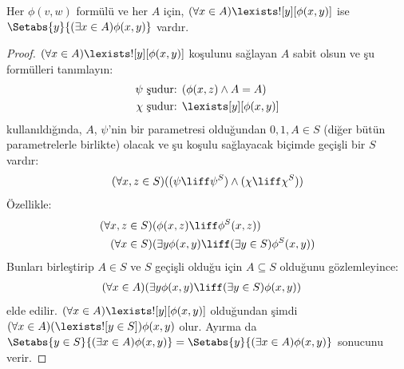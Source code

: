 \begin{thm}\label{thm:replacement} 
Her $\phi(v,w)$ formülü ve her $A$ için, $(\forall x \in
A)\lexists![y][\phi(x,y)]$ ise $\Setabs{y}{(\exists x \in A)\phi(x,y)}$
vardır.
\end{thm}

\begin{proof}
$(\forall x \in A)\lexists![y][\phi(x,y)]$ koşulunu sağlayan $A$ sabit olsun
ve şu formülleri tanımlayın:
\begin{align*}
	\psi &\text{ şudur: } (\phi(x, z) \land A = A)\\
	\chi &\text{ şudur: } \lexists[y][\phi(x, y)]
\end{align*}
 kullanıldığında, $A$, $\psi$'nin bir parametresi
olduğundan $0, 1, A \in S$ (diğer bütün parametrelerle birlikte) olacak ve
şu koşulu sağlayacak biçimde geçişli bir $S$ vardır:
\[
	(\forall x,z \in S)((\psi \liff \psi^S) \land (\chi \liff \chi^S))
\]
Özellikle:
\begin{align*}
	(\forall  x, z \in S)(&\phi(x, z) \liff \phi^S(x, z))\\
	(\forall x \in S)(&\exists y\phi(x, y) \liff (\exists y \in S)\phi^S(x, y)) 
\end{align*}
Bunları birleştirip $A \in S$ ve $S$ geçişli olduğu için $A \subseteq S$
olduğunu gözlemleyince:
\begin{align*}
	(\forall x \in A)(&\exists y\phi(x, y) \liff (\exists y \in S)\phi(x, y))
\end{align*}
elde edilir. $(\forall x \in A)\lexists![y][\phi(x, y)]$ olduğundan şimdi
$(\forall x \in A)(\lexists![y \in S])\phi(x, y)$ olur. Ayırma da
$\Setabs{y \in S}{(\exists x \in A) \phi(x, y)} =
\Setabs{y}{(\exists x \in A) \phi(x, y)}$ sonucunu verir.
\end{proof}

